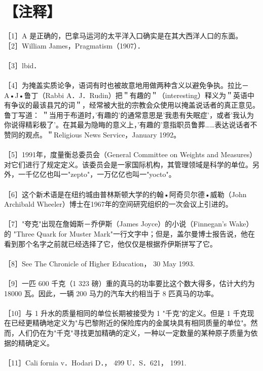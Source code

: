 \section*{【注释】}
［1］A 是正确的，巴拿马运河的太平洋入口确实是在其大西洋人口的东面。\\
［2］William James，Pragmatism（1907）．\\\\
［3］lbid．\\\\
［4］为掩盖实质论争，语词有时也被故意地用做两种含义以避免争执。拉比－ A•J•鲁丁（Rabbi A．J．Rudin）把＂有趣的＂（interesting）释义为＂英语中有争议的最该县咒的词＂，经常被大批的宗教会众使用以掩盖说话者的真正意见。鲁丁写道： ＂当用于布道时，'有趣的'的通常意思是'我患有失眠症'，或者'我认为你说得精彩极了'。在其最为隐䀲的意义上，'有趣的'意指职员鲁葬……表达说话者不赞同的观点。＂Religious News Service，January 1992。\\\\
［5］1991年，度量衡总委员会（General Committee on Weights and Measures）对它们进行了规定定义。该委员会是一家国际机构，其管理领域是科学的单位。另外，一千亿亿也叫一"zepto"，一万亿亿也叫一"yocto"。\\\\
［6］这个新术语是在纽约城由普林斯顿大学的约翰•阿奇贝尔德•威勒（John Archibald Wheeler）博士在1967年的空间研究组织的一次会议上引进的。\\\\
［7］"夸克"出现在詹姆斯－乔伊斯（James Joyce）的小说（Finnegan's Wake）的 "Three Quark for Muster Mark"一行文字中；但是，盖尔曼博士报告说，他在看到那个名字之前就已经选择了它，他仅仅是根据乔伊斯拼写了它。\\\\
［8］See The Chronicle of Higher Education， 30 May 1993.\\\\
［9］一匹 600 千克（1 323 磅）重的真马的功率要比这个数大得多，估计大约为 18000 瓦。因此，一辆 200 马力的汽车大约相当于 8 匹真马的功率。\\\\
［10］与 1 升水的质量相同的单位长期被接受为 1 "千克"的定义。但是 1 千克现在已经更精确地定义为"与巴黎附近的保险库内的金属块具有相同质量的单位"。然而，人们仍在为"千克"寻找更加精确的定义，一种以一定数量的某种原子质量为依据的精确定义。\\\\
［11］Cali fornia v．Hodari D．， 499 U．S．621， 1991.\\\\
